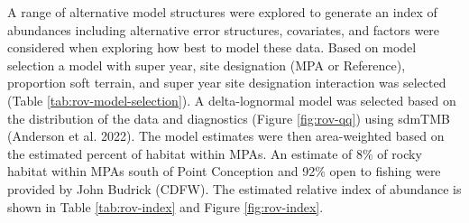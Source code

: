 \documentclass[11pt,
  english,
  letterpaper,
]{article}
\begin{document}
A range of alternative model structures were explored to generate an index of abundances including alternative error structures, covariates, and factors were considered when exploring how best to model these data. Based on model selection a model with super year, site designation (MPA or Reference), proportion soft terrain, and super year site designation interaction was selected (Table \ref{tab:rov-model-selection}). A delta-lognormal model was selected based on the distribution of the data and diagnostics (Figure \ref{fig:rov-qq}) using sdmTMB (Anderson et al. 2022). The model estimates were then area-weighted based on the estimated percent of habitat within MPAs. An estimate of 8\% of rocky habitat within MPAs south of Point Conception and 92\% open to fishing were provided by John Budrick (CDFW). The estimated relative index of abundance is shown in Table \ref{tab:rov-index} and Figure \ref{fig:rov-index}.

\newpage



\newpage

\begingroup\fontsize{7}{9}\selectfont
\end{document}
